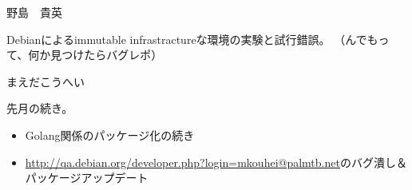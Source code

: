 \begin{prework}{ 野島　貴英 }

 Debianによるimmutable infrastractureな環境の実験と試行錯誤。
（んでもって、何か見つけたらバグレポ）

\end{prework}

\begin{prework}{ まえだこうへい }

先月の続き。

\begin{itemize}
\item Golang関係のパッケージ化の続き
\item \url{http://qa.debian.org/developer.php?login=mkouhei@palmtb.net}のバグ潰し＆パッケージアップデート
\end{itemize}
\end{prework}

